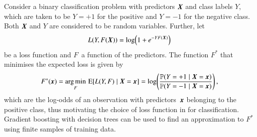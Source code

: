 Consider a binary classification problem with predictors $\myvec{X}$ and class
labels $Y$, which are taken to be $Y = +1$ for the positive and $Y = -1$ for the
negative class. Both $\myvec{X}$ and $Y$ are considered to be random
variables. Further, let
\begin{align}
  L(Y, F(\myvec{X})) = \log\mathopen{}\left(
  1 + e^{-Y F(\myvec{X})}
  \right)\mathclose{}
  \label{eq:loss_gradboost}
\end{align}
be a loss function and $F$~a function of the predictors. The function $F^*$ that
minimises the expected loss is given by
\begin{align}
  F^*(\myvec{x})
  = \argmin_F \, \expect[ L(Y, F) \mid \myvec{X} = \myvec{x} ]
  = \log\mathopen{}\left(
  \frac{
  \mathbb{P}(Y = +1 \mid \myvec{X} = \myvec{x})
  }{
  \mathbb{P}(Y = -1 \mid \myvec{X} = \myvec{x})
  }
  \right)\mathclose{} \,\text{,}
  \label{eq:gradboost_logodds}
\end{align}
which are the log-odds of an observation with predictors~$\myvec{x}$ belonging
to the positive class, thus motivating the choice of loss function in
 for classification.
Gradient boosting with decision trees can be used to find an approximation to
$F^*$ using finite samples of training data.


